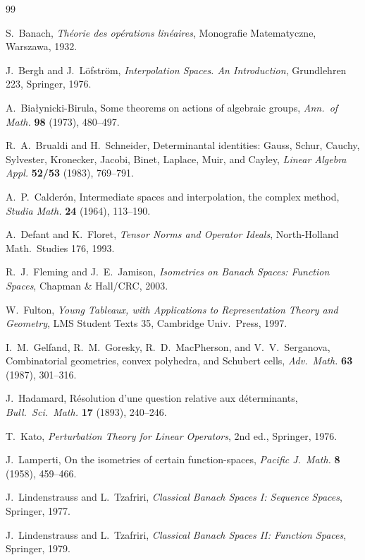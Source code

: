 \documentclass[11pt]{amsart}
\theoremstyle{definition}
\begin{document}
\begin{thebibliography}{99}

 S.~Banach, \emph{Th\'eorie des op\'erations lin\'eaires}, Monografie Matematyczne, Warszawa, 1932.

 J.~Bergh and J.~L\"ofstr\"om, \emph{Interpolation Spaces. An Introduction}, Grundlehren 223, Springer, 1976.

 A.~Bia\l ynicki-Birula, Some theorems on actions of algebraic groups, \emph{Ann.\ of Math.} \textbf{98} (1973), 480--497.

 R.~A.~Brualdi and H.~Schneider, Determinantal identities: Gauss, Schur, Cauchy, Sylvester, Kronecker, Jacobi, Binet, Laplace, Muir, and Cayley, \emph{Linear Algebra Appl.} \textbf{52/53} (1983), 769--791.

 A.~P.~Calder\'on, Intermediate spaces and interpolation, the complex method, \emph{Studia Math.} \textbf{24} (1964), 113--190.

 A.~Defant and K.~Floret, \emph{Tensor Norms and Operator Ideals}, North-Holland Math.\ Studies 176, 1993.

 R.~J.~Fleming and J.~E.~Jamison, \emph{Isometries on Banach Spaces: Function Spaces}, Chapman \& Hall/CRC, 2003.

 W.~Fulton, \emph{Young Tableaux, with Applications to Representation Theory and Geometry}, LMS Student Texts 35, Cambridge Univ.\ Press, 1997.

 I.~M.~Gelfand, R.~M.~Goresky, R.~D.~MacPherson, and V.~V.~Serganova, Combinatorial geometries, convex polyhedra, and Schubert cells, \emph{Adv.\ Math.} \textbf{63} (1987), 301--316.

 J.~Hadamard, R\'esolution d'une question relative aux d\'eterminants, \emph{Bull.\ Sci.\ Math.} \textbf{17} (1893), 240--246.

 T.~Kato, \emph{Perturbation Theory for Linear Operators}, 2nd ed., Springer, 1976.

 J.~Lamperti, On the isometries of certain function-spaces, \emph{Pacific J.\ Math.} \textbf{8} (1958), 459--466.

 J.~Lindenstrauss and L.~Tzafriri, \emph{Classical Banach Spaces I: Sequence Spaces}, Springer, 1977.

 J.~Lindenstrauss and L.~Tzafriri, \emph{Classical Banach Spaces II: Function Spaces}, Springer, 1979.


\end{thebibliography}
\end{document}
